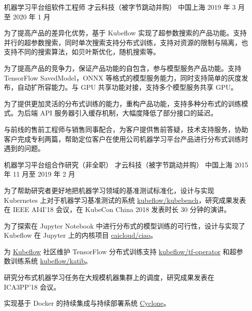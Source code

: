 \begin{cventries}
  \cventry
    {机器学习平台组软件工程师} %
    {才云科技（被字节跳动并购）} %
    {中国上海} %
    {2019 年 3 月至 2020 年 1 月} %
    {
      \begin{cvitems} %
        \item 为了提高产品的差异化优势，基于 Kubeflow 实现了超参数搜索的产品功能。支持并行的超参数搜索，同时单次搜索支持分布式训练，支持对资源的限制与隔离，也支持不同的搜索算法，如贝叶斯优化，随机搜索等。
        \item 为了提高产品的竞争力，保证产品功能的自包含，参与模型服务产品功能。支持 TensorFlow SavedModel，ONNX 等格式的模型服务能力，同时支持简单的灰度发布，自动扩所容能力。与 GPU 共享功能对接，支持多个模型服务共享 GPU。
        \item 为了提供更加灵活的分布式训练的能力，重构产品功能，支持多种分布式的训练模式。为后端 API 服务器引入缓存机制，大幅度降低了部分接口的延迟。
        \item 与前线的售前工程师与销售同事配合，为客户提供售前答疑，技术支持服务，协助客户完成专利两篇，帮助定位客户在使用公司机器学习平台产品进行分布式训练时遇到的问题。
      \end{cvitems}
    }

  \cventry
    {机器学习平台组合作研究（非全职）} %
    {才云科技（被字节跳动并购）} %
    {中国上海} %
    {2015 年 11 月至 2019 年 2 月} %
    {
      \begin{cvitems} %
        \item 为了帮助研究者更好地把机器学习领域的基准测试标准化，设计与实现 Kubernetes 上对于机器学习基准测试的系统 \href{https://github.com/kubeflow/kubebench}{kubeflow/kubebench}，研究成果发表在 IEEE AI4I'18 会议，在 KubeCon China 2018 发表时长 30 分钟的演讲。
        \item 为了探索在 Jupyter Notebook 中进行分布式的模型训练的可行性，设计与实现了 Kubeflow 在 Jupyter 上的内核项目 \href{https://github.com/caicloud/ciao}{caicloud/ciao}。
        \item 为 \href{https://github.com/kubeflow/kubeflow}{Kubeflow} 社区维护 TensorFlow 分布式训练支持 \href{https://github.com/kubeflow/tf-operator}{kubeflow/tf-operator} 和超参数训练系统 \href{https://github.com/kubeflow/katib}{kubeflow/katib}。
        \item 研究分布式机器学习任务在大规模机器集群上的调度，研究成果发表在 ICA3PP'18 会议。
        \item 实现基于 Docker 的持续集成与持续部署系统 \href{https://github.com/caicloud/cyclone}{Cyclone}。
      \end{cvitems}
    }

\end{cventries}
